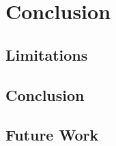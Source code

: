 %

\chapter{Conclusion}
\label{chap:conclusion}

\section{Limitations}

\section{Conclusion}

\section{Future Work}

